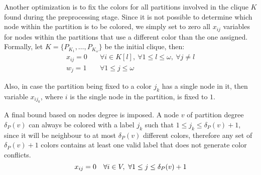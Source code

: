 Another optimization is to fix the colors for all partitions involved in the clique $K$ found during the preprocessing stage. Since it is not possible to determine which node within the partition is to be colored, we simply set to zero all $x_{ij}$ variables for nodes within the partitions that use a different color than the one assigned. Formally, let $K = \{ P_{K_1}, \ldots, P_{K_\omega} \}$ be the initial clique, then:
\begin{align*}
x_{ij} = 0 \quad &\forall i \in K[l],\ \forall 1 \leq l \leq \omega,\ \forall j \neq l \\
w_j = 1 \quad &\forall 1 \leq j \leq \omega
\end{align*}

Also, in case the partition being fixed to a color $j_k$ has a single node in it, then variable $x_{ij_0}$, where $i$ is the single node in the partition, is fixed to $1$.

A final bound based on nodes degree is imposed. A node $v$ of partition degree $\delta_P(v)$ can always be colored with a label $j_k$ such that $1 \leq j_k \leq \delta_P(v) + 1$, since it will be neighbour to at most $\delta_P(v)$ different colors, therefore any set of $\delta_P(v) + 1$ colors contains at least one valid label that does not generate color conflicts.  
\begin{equation*}
x_{ij} = 0 \quad \forall i \in V,\ \forall 1 \leq j \leq \delta_P(v) + 1 \\
\end{equation*}